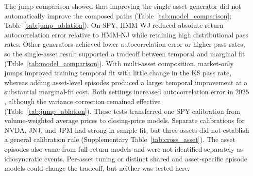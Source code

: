 The jump comparison showed that improving the single-asset generator
did not automatically improve the composed paths
(Table~\ref{tab:model_comparison}; Table~\ref{tab:jump_ablation}). On SPY, HMM-WJ
reduced absolute-return autocorrelation error relative to HMM-NJ while
retaining high distributional pass rates. Other generators achieved
lower autocorrelation error or higher pass rates, so the single-asset
result supported a tradeoff between temporal and marginal fit
(Table~\ref{tab:model_comparison}). With multi-asset composition,
market-only jumps improved training temporal fit with little change
in the KS pass rate, whereas adding asset-level episodes produced a
larger temporal improvement at a substantial marginal-fit cost.
Both settings increased autocorrelation error in $2025$, although
the variance correction remained effective
(Table~\ref{tab:jump_ablation}). These tests transferred one SPY
calibration from volume-weighted average prices to closing-price
models. Separate calibrations for NVDA, JNJ, and JPM had strong
in-sample fit, but three assets did not establish a general calibration
rule (Supplementary Table~\ref{tab:cross_asset}). The asset episodes also came from
full-return models and were not identified separately as idiosyncratic
events. Per-asset tuning or distinct shared and asset-specific episode
models could change the tradeoff, but neither was tested here.

